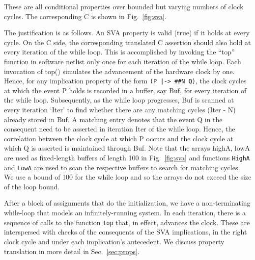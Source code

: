 \noindent These are all conditional properties over bounded but varying numbers of clock cycles. The corresponding C is shown in Fig.~\ref{fig:sva}. 

The justification is as follows. An SVA property is valid (true) if it holds at every cycle. On the C side, the corresponding translated C assertion should also hold at every iteration of the while loop.  This is accomplished
by invoking the ``top'' function in software netlist only once for each iteration of the while loop. Each invocation of top() simulates the advancement of the hardware clock by one. Hence, for any implication property of the form \texttt{(P |-> \#\#N Q)}, the clock cycles at which the event P holds is recorded in a buffer, say Buf, for every iteration of the while loop.  Subsequently, as the while loop progresses, Buf is scanned at every iteration `Iter' to find whether there are any matching cycles (Iter - N) already stored in Buf. A matching entry denotes that the event Q in the consequent need to be asserted in iteration Iter of the while loop.  Hence, the correlation between the clock cycle at which P occurs and the clock cycle at which Q is asserted is maintained through Buf.  Note that the arrays highA, lowA are used as fixed-length buffers of length 100 in Fig.~\ref{fig:sva} and functions \texttt{HighA} and \texttt{LowA} are used to scan the respective buffers to search for matching cycles. We use a bound of 100 for the while loop and so the arrays do not exceed the size of the loop bound.

After a block of assignments that do the initialization, we have a non-terminating while-loop that models an infinitely-running system. In each iteration, there is a sequence of calls to the function \texttt{top} that, in effect, advances the clock. These are interspersed with checks of the consequents of the SVA implications, in the right clock cycle and under each implication's antecedent. We discuss property translation in more detail in Sec.~\ref{sec:props}.

